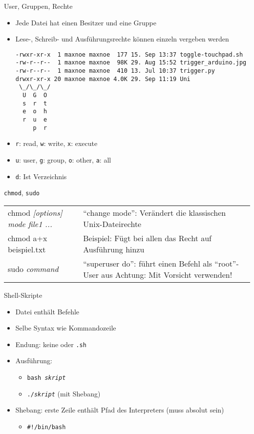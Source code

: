 \begin{frame}[fragile]{User, Gruppen, Rechte}
  \begin{itemize}
    \item Jede Datei hat einen Besitzer und eine Gruppe
    \item Lese-, Schreib- und Ausführungsrechte können einzeln vergeben werden
    \begin{verbatim}
-rwxr-xr-x  1 maxnoe maxnoe  177 15. Sep 13:37 toggle-touchpad.sh
-rw-r--r--  1 maxnoe maxnoe  98K 29. Aug 15:52 trigger_arduino.jpg
-rw-r--r--  1 maxnoe maxnoe  410 13. Jul 10:37 trigger.py
drwxr-xr-x 20 maxnoe maxnoe 4.0K 29. Sep 11:19 Uni
 \_/\_/\_/
  U  G  O
  s  r  t
  e  o  h
  r  u  e
     p  r
    \end{verbatim}
    \item \texttt{r}: read, \texttt{w}: write, \texttt{x}: execute 
    \item \texttt{u}: user, \texttt{g}: group, \texttt{o}: other, \texttt{a}: all 
    \item \texttt{d}: Ist Verzeichnis
  \end{itemize}
  
\end{frame}

\begin{frame}{\texttt{chmod}, \texttt{sudo}}
  \begin{tabu}{>{\ttfamily}l X[,L]}
    chmod \textit{[options] mode file1 ...}    & \enquote{change mode}: Verändert die klassischen Unix-Dateirechte  \\
    chmod a+x beispiel.txt    & Beispiel: Fügt bei allen das Recht auf Ausführung hinzu \\
    sudo \textit{command} & \enquote{superuser do}: führt einen Befehl als \enquote{root}-User aus \alert{Achtung}: Mit Vorsicht verwenden!\\
  \end{tabu}
\end{frame}

\begin{frame}{Shell-Skripte}
  \begin{itemize}
    \item Datei enthält Befehle
    \item Selbe Syntax wie Kommandozeile
    \item Endung: keine oder \texttt{.sh}
    \item Ausführung:
      \begin{itemize}
        \item \texttt{bash \textit{skript}}
        \item \texttt{./\textit{skript}} (mit Shebang)
      \end{itemize}
    \item Shebang: erste Zeile enthält Pfad des Interpreters (muss absolut sein)
      \begin{itemize}
        \item \texttt{\#!/bin/bash}
      \end{itemize}
  \end{itemize}
\end{frame}

